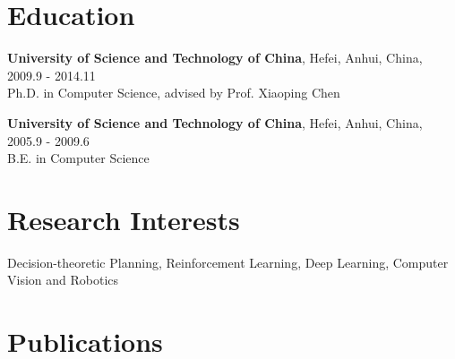 \documentclass[letterpaper, fontset=adobe, 10pt]{ctexart}
\renewenvironment{itemize}{
  \begin{list}{}{
    \setlength{\leftmargin}{1.5em}
  }
}{
  \end{list}
}
\begin{document}
\vspace{20pt}
\section*{Education}
\begin{itemize}
	\item {\bf University of Science and Technology of China}, Hefei, Anhui, China, 2009.9 - 2014.11 \\
	      Ph.D. in Computer Science, advised by Prof. Xiaoping Chen \\
	\item {\bf University of Science and Technology of China}, Hefei, Anhui, China, 2005.9 - 2009.6 \\
	      B.E. in Computer Science
\end{itemize}

\vspace{20pt}
\section*{Research Interests}
\begin{itemize}
	\item Decision-theoretic Planning, Reinforcement Learning, Deep Learning, Computer Vision and Robotics
\end{itemize}

\vspace{20pt}
\section*{Publications}
\nocite{*}



\vspace{20pt}
\end{document}
